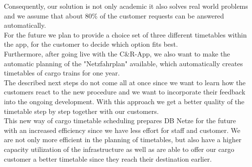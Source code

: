 Consequently, our solution is not only academic it also solves real world problems and we assume that about 80\% of the customer requests can be answered automatically. \\
For the future we plan to provide a choice set of three different timetables within the app, for the customer to decide which option fits best. \\
Furthermore, after going live with the C\&R-App, we also want to make the automatic planning of the "Netzfahrplan" available, which automatically creates timetables of cargo trains for one year. \\
The described next steps do not come all at once since we want to learn how the customers react to the new procedure and we want to incorporate their feedback into the ongoing development. With this approach we get a better quality of the timetable step by step together with our customers. \\
This new way of cargo timetable scheduling prepares DB Netze for the future with an increased efficiency since we have less effort for staff and customer. We are not only more efficient in the planning of timetables, but also have a higher capacity utilization of the infrastructure as well as are able to offer our cargo customer a better timetable since they reach their destination earlier.   \\

